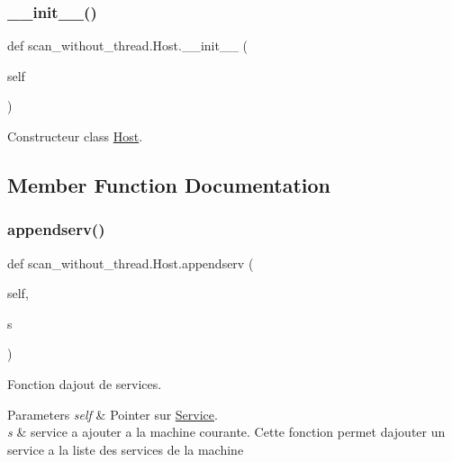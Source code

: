 \subsubsection{\texorpdfstring{\+\_\+\+\_\+init\+\_\+\+\_\+()}{\_\_init\_\_()}}
{\footnotesize\ttfamily def scan\+\_\+without\+\_\+thread.\+Host.\+\_\+\+\_\+init\+\_\+\+\_\+ (\begin{DoxyParamCaption}\item[{}]{self }\end{DoxyParamCaption})}



Constructeur class \hyperlink{classscan__without__thread_1_1Host}{Host}. 



\subsection{Member Function Documentation}
\hypertarget{classscan__without__thread_1_1Host_ac10ad05ee73fee33054ec53f2167d63d}{}\label{classscan__without__thread_1_1Host_ac10ad05ee73fee33054ec53f2167d63d} 
\subsubsection{\texorpdfstring{appendserv()}{appendserv()}}
{\footnotesize\ttfamily def scan\+\_\+without\+\_\+thread.\+Host.\+appendserv (\begin{DoxyParamCaption}\item[{}]{self,  }\item[{}]{s }\end{DoxyParamCaption})}



Fonction d\textquotesingle{}ajout de services. 


\begin{DoxyParams}{Parameters}
{\em self} & Pointer sur \hyperlink{classscan__without__thread_1_1Service}{Service}. \\
\hline
{\em s} & service a ajouter a la machine courante. Cette fonction permet d\textquotesingle{}ajouter un service a la liste des services de la machine \\
\hline
\end{DoxyParams}
\hypertarget{classscan__without__thread_1_1Host_a9780fad45e0730e7f897ede240b616a6}{}\label{classscan__without__thread_1_1Host_a9780fad45e0730e7f897ede240b616a6} 
